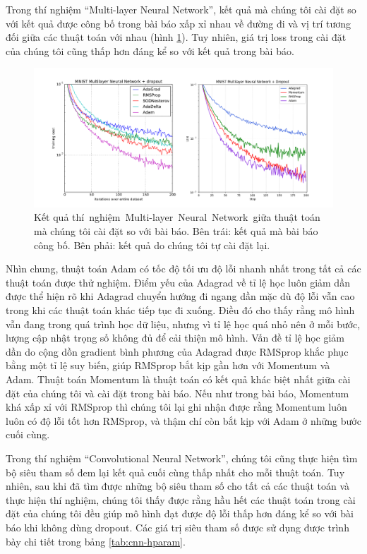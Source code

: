 Trong thí nghiệm ``Multi-layer Neural Network'', kết quả mà chúng tôi cài đặt so với kết quả được công bố trong bài báo xấp xỉ nhau về đường đi và vị trí tương đối giữa các thuật toán với nhau (hình \ref{fig:exp-mlp}). Tuy nhiên, giá trị loss trong cài đặt của chúng tôi cũng thấp hơn đáng kể so với kết quả trong bài báo.

\begin{figure}[htp]
	\centering
	\includegraphics[width=140 mm]{images/mlp.png}
	\caption{Kết quả thí nghiệm Multi-layer Neural Network giữa thuật toán mà chúng tôi cài đặt so với bài báo. Bên trái: kết quả mà bài báo công bố. Bên phải: kết quả do chúng tôi tự cài đặt lại.}
	\label{fig:exp-mlp}
\end{figure}

Nhìn chung, thuật toán Adam có tốc độ tối ưu độ lỗi nhanh nhất trong tất cả các thuật toán được thử nghiệm. Điểm yếu của Adagrad về tỉ lệ học luôn giảm dần được thể hiện rõ khi Adagrad chuyển hướng đi ngang dần mặc dù độ lỗi vẫn cao trong khi các thuật toán khác tiếp tục đi xuống. Điều đó cho thấy rằng mô hình vẫn đang trong quá trình học dữ liệu, nhưng vì tỉ lệ học quá nhỏ nên ở mỗi bước, lượng cập nhật trọng số không đủ để cải thiện mô hình. Vấn đề tỉ lệ học giảm dần do cộng dồn gradient bình phương của Adagrad được RMSprop khắc phục bằng một tỉ lệ suy biến, giúp RMSprop bắt kịp gần hơn với Momentum và Adam. Thuật toán Momentum là thuật toán có kết quả khác biệt nhất giữa cài đặt của chúng tôi và cài đặt trong bài báo. Nếu như trong bài báo, Momentum khá xấp xỉ với RMSprop thì chúng tôi lại ghi nhận được rằng Momentum luôn luôn có độ lỗi tốt hơn RMSprop, và thậm chí còn bắt kịp với Adam ở những bước cuối cùng.

Trong thí nghiệm ``Convolutional Neural Network'', chúng tôi cũng thực hiện tìm bộ siêu tham số đem lại kết quả cuối cùng thấp nhất cho mỗi thuật toán. Tuy nhiên, sau khi đã tìm được những bộ siêu tham số cho tất cả các thuật toán và thực hiện thí nghiệm, chúng tôi thấy được rằng hầu hết các thuật toán trong cài đặt của chúng tôi đều giúp mô hình đạt được độ lỗi thấp hơn đáng kể so với bài báo khi không dùng dropout. Các giá trị siêu tham số được sử dụng được trình bày chi tiết trong bảng \ref{tab:cnn-hparam}.


